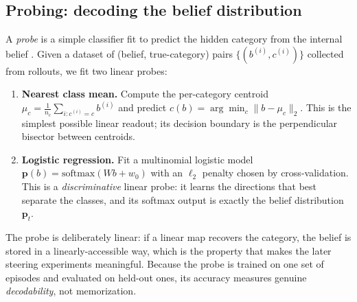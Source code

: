 \documentclass[11pt]{article}
\begin{document}
\subsection{Probing: decoding the belief distribution}
\label{sec:probe}
A \emph{probe} is a simple classifier fit to predict the hidden category from the
internal belief \cite{ravichander2021probing,li2023othello}. Given a dataset of
(belief, true-category) pairs $\{(b^{(i)}, c^{(i)})\}$ collected from rollouts,
we fit two linear probes:
\begin{enumerate}[nosep]
\item \textbf{Nearest class mean.} Compute the per-category centroid
$\mu_c=\frac{1}{n_c}\sum_{i:c^{(i)}=c} b^{(i)}$ and predict
$\hat c(b)=\arg\min_c \|b-\mu_c\|_2$. This is the simplest possible linear
readout; its decision boundary is the perpendicular bisector between centroids.
\item \textbf{Logistic regression.} Fit a multinomial logistic model
$\mathbf{p}(b)=\mathrm{softmax}(Wb+w_0)$ with an $\ell_2$ penalty chosen by
cross-validation. This is a \emph{discriminative} linear probe: it learns the
directions that best separate the classes, and its softmax output is exactly the
belief distribution $\mathbf{p}_t$.
\end{enumerate}
The probe is deliberately linear: if a linear map recovers the category, the
belief is stored in a linearly-accessible way, which is the property that makes
the later steering experiments meaningful. Because the probe is trained on one
set of episodes and evaluated on held-out ones, its accuracy measures genuine
\emph{decodability}, not memorization.
\end{document}
